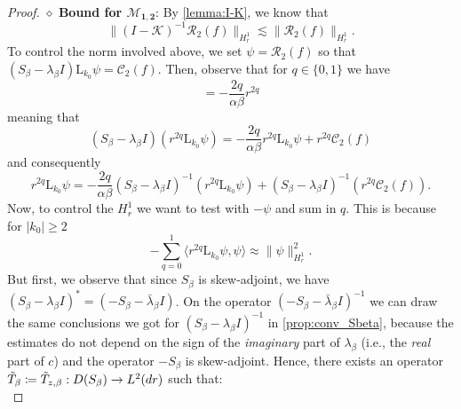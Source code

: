 \documentclass[11pt,reqno]{amsproc}
\newcommand{\red}[1]{\textcolor{red}{#1}}
\def\dd{{\rm d}}
\def\HH {\dot{H}^1}
\newcommand{\rmL}{\mathrm{L}}
\newcommand{\cM}{\mathcal{M}}
\newcommand{\cK}{\mathcal{K}}
\newcommand{\cR}{\mathcal{R}}
\theoremstyle{definition}
\theoremstyle{definition}
\numberwithin{equation}{section}
\begin{document}
\begin{proof}

\medskip

\noindent $\diamond$ \textbf{Bound for $\mathbf{\cM_{1,2}}$}: By \cref{lemma:I-K}, we know that 
\begin{equation}
    \|(I-\cK)^{-1}\cR_2(f)\|_{H^1_r}\lesssim \| \cR_2(f)\|_{H^1_r}.
\end{equation}
To control the norm involved above, we set $\psi = \mathcal R_2(f)$ so that $(S_\beta-\lambda_\beta I)\rmL_{k_0} \psi = 
\mathcal{C}_2(f)$. Then, observe that for $q\in \{0,1\}$ we have 
\begin{equation}
    [S_\beta-\lambda_\beta I,r^{2q}]=-\frac{2q}{\alpha \beta}r^{2q}
\end{equation}
meaning that
\begin{equation}
    (S_\beta-\lambda_\beta I)(r^{2q}\rmL_{k_0} \psi )= -\frac{2q}{\alpha \beta}r^{2q}\rmL_{k_0}\psi+r^{2q}
\mathcal{C}_2(f)
\end{equation}
and consequently
\begin{equation}
\label{eq:rqpsi}
   r^{2q}\rmL_{k_0} \psi=-\frac{2q}{\alpha\beta}(S_\beta-\lambda_\beta I)^{-1}(r^{2q}\rmL_{k_0}\psi) +(S_\beta-\lambda_\beta I)^{-1}(r^{2q}\mathcal{C}_2(f)).
\end{equation}
Now, to control the $H^1_r$ we want to test with $-\psi$ and sum in $q$. This is because for $|k_0|\geq 2$
\begin{equation}
- \sum_{q=0}^1\langle r^{2q}\rmL_{k_0} \psi,\psi\rangle \approx \|\psi\|_{H^1_r}^2.
\end{equation}
But first, we observe that 
since $S_\beta$ is skew-adjoint, we have  $(S_\beta-\lambda_\beta I)^* = (-S_\beta -\bar{\lambda}_\beta I)$. On the operator $(-S_\beta - \bar{\lambda}_\beta I)^{-1}$ we can draw the same conclusions we got for $(S_\beta - \lambda_\beta I)^{-1}$ in \cref{prop:conv_Sbeta}, because the estimates do not depend on the sign of the \textit{imaginary} part of $\lambda_\beta$ (i.e., the \textit{real} part of $c$) and the operator $-S_\beta$ is skew-adjoint. Hence, there exists an operator $\tilde T_{\beta}\coloneqq \tilde T_{z,\beta} :D(S_\beta) \to L^2(\dd r)$ such that:
\begin{equation}

\end{equation}
\end{proof}
\end{document}
